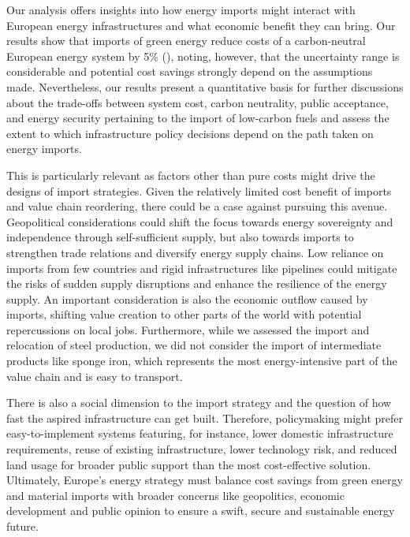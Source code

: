 
Our analysis offers insights into how energy imports might interact with
European energy infrastructures and what economic benefit they can bring. Our
results show that imports of green energy reduce costs of a carbon-neutral
European energy system by 5\% (), noting, however, that the
uncertainty range is considerable and potential cost savings strongly depend on
the assumptions made.
Nevertheless, our results present a quantitative basis for
further discussions about the trade-offs between system cost, carbon neutrality,
public acceptance, and energy security pertaining to the import of low-carbon
fuels and assess the extent to which infrastructure policy decisions depend on
the path taken on energy imports.

This is particularly relevant as factors other than pure costs might drive the
designs of import strategies. Given the relatively limited cost benefit of imports and value
chain reordering, there could be a case against pursuing this avenue.
Geopolitical considerations could shift the focus towards energy sovereignty and
independence through self-sufficient supply, but also towards imports to
strengthen trade relations and diversify energy supply chains.
Low reliance on
imports from few countries and rigid infrastructures like pipelines could
mitigate the risks of sudden supply disruptions and enhance the resilience of
the energy supply. An important consideration is also the economic outflow
caused by imports, shifting value creation to other parts of the world with
potential repercussions on local jobs. Furthermore, while we assessed the import
and relocation of steel production, we did not consider the import of
intermediate products like sponge iron, which represents the most
energy-intensive part of the value chain and is easy to transport.


There is also a social dimension to the import strategy and the question of how
fast the aspired infrastructure can get built. Therefore, policymaking might
prefer easy-to-implement systems featuring, for instance, lower domestic
infrastructure requirements, reuse of existing infrastructure, lower technology
risk, and reduced land usage for broader public support than the most
cost-effective solution. Ultimately, Europe's energy strategy must balance cost
savings from green energy and material imports with broader concerns like
geopolitics, economic development and public opinion to ensure a swift, secure
and sustainable energy future.
